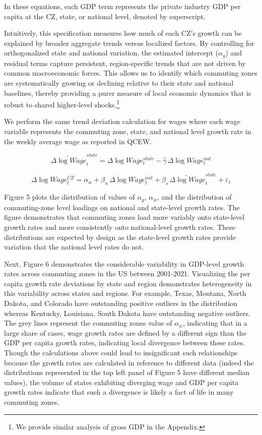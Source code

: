\documentclass[
  10pt,
]{article}
\begin{document}
In these equations, each GDP term represents the private industry GDP
per capita at the CZ, state, or national level, denoted by superscript.

Intuitively, this specification measures how much of each CZ's growth
can be explained by broader aggregate trends versus localized factors.
By controlling for orthogonalized state and national variation, the
estimated intercept (\(\alpha_{g}\)) and residual terms capture
persistent, region‐specific trends that are not driven by common
macroeconomic forces. This allows us to identify which commuting zones
are systematically growing or declining relative to their state and
national baselines, thereby providing a purer measure of local economic
dynamics that is robust to shared higher-level
shocks.\footnote{We provide similar analysis of gross GDP in the Appendix.}

We perform the same trend deviation calculation for wages where each
wage variable represents the commuting zone, state, and national level
growth rate in the weekly average wage as reported in QCEW.

\[
\widetilde{\Delta \log Wage}^{state}_{t} 
= \Delta \log Wage^{state}_{t} 
- \hat{\gamma}\, \Delta \log Wage^{nat}_{t}
\]

\[
\Delta \log Wage^{CZ}_{t} 
= \alpha_{w} 
+ \beta_{n} \, \Delta \log Wage^{nat}_{t} 
+ \beta_{s} \, \widetilde{\Delta \log Wage}^{state}_{t} 
+ \varepsilon_{t}
\]

Figure 5 plots the distribution of values of \(\alpha_g\), \(\alpha_w\),
and the distribution of commuting-zone level loadings on national and
state-level growth rates. The figure demonstrates that commuting zones
load more variably onto state-level growth rates and more consistently
onto national-level growth rates. These distributions are expected by
design as the state-level growth rates provide variation that the
national level rates do not.

Next, Figure 6 demonstrates the considerable variability in GDP-level
growth rates across commuting zones in the US between 2001-2021.
Visualizing the per capita growth rate deviations by state and region
demonstrates heterogeneity in this variability across states and
regions. For example, Texas, Montana, North Dakota, and Colorado have
outstanding positive outliers in the distribution whereas Kentucky,
Louisiana, South Dakota have outstanding negative outliers. The grey
lines represent the commuting zones value of \(\alpha_w\), indicating
that in a large share of cases, wage growth rates are defined by a
different sign than the GDP per capita growth rates, indicating local
divergence between these rates. Though the calculations above could lead
to insignificant such relationships because the growth rates are
calculated in reference to different data (indeed the distributions
represented in the top left panel of Figure 5 have different median
values), the volume of states exhibiting diverging wage and GDP per
capita growth rates indicate that such a divergence is likely a fact of
life in many commuting zones.
\end{document}
